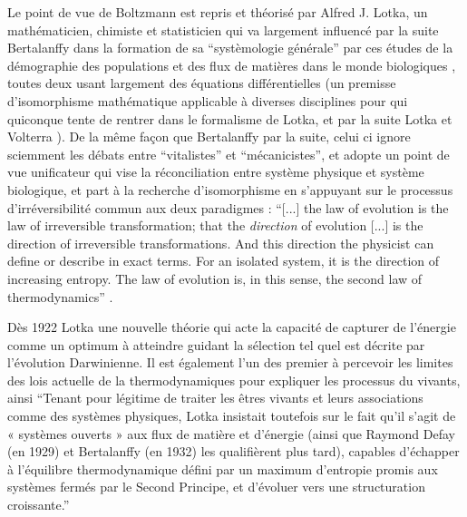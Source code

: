 Le point de vue de Boltzmann est repris et théorisé par Alfred J. Lotka, un mathématicien, chimiste et statisticien qui va largement influencé par la suite Bertalanffy dans la formation de sa \enquote{systèmologie générale} \autocite[178]{Pouvreau2013} par ces études de la démographie des populations et des flux de matières dans le monde biologiques \autocite[545-546]{Pouvreau2013} , toutes deux usant largement des équations différentielles (un premisse d'isomorphisme mathématique applicable à diverses disciplines pour qui quiconque tente de rentrer dans le formalisme de Lotka, et par la suite Lotka et Volterra \autocite[550]{Pouvreau2013}). De la même façon que Bertalanffy par la suite, celui ci ignore sciemment les débats entre \enquote{vitalistes} et \enquote{mécanicistes}, et adopte un point de vue unificateur qui vise la réconciliation entre système physique et système biologique, et part à la recherche d'isomorphisme en s'appuyant sur le processus d'irréversibilité commun aux deux paradigmes : \enquote{[...] the law of evolution is the law of irreversible transformation; that the \textit{direction} of evolution [...] is the direction of irreversible transformations. And this direction the physicist can define or describe in exact terms. For an isolated system, it is the direction of increasing entropy.  The law of evolution is, in this sense, the second law of thermodynamics} \autocite[26]{Lotka1925}.

Dès 1922 \autocite{Lotka1922a} \autocite{Lotka1922b} Lotka une nouvelle théorie qui acte la capacité de capturer de l'énergie comme un optimum à atteindre guidant la sélection tel quel est décrite par l'évolution Darwinienne. Il est également l'un des premier à percevoir les limites des lois actuelle de la thermodynamiques pour expliquer les processus du vivants, ainsi \enquote{Tenant pour légitime de traiter les êtres vivants et leurs associations comme des systèmes physiques, Lotka insistait toutefois sur le fait qu’il s’agit de « systèmes ouverts » aux flux de matière et d’énergie (ainsi que Raymond Defay (en 1929) et Bertalanffy (en 1932) les qualifièrent plus tard), capables d’échapper à l’équilibre thermodynamique défini par un maximum d’entropie promis aux systèmes fermés par le Second Principe, et d’évoluer vers une structuration croissante.} \autocite[179]{Pouvreau2013}

